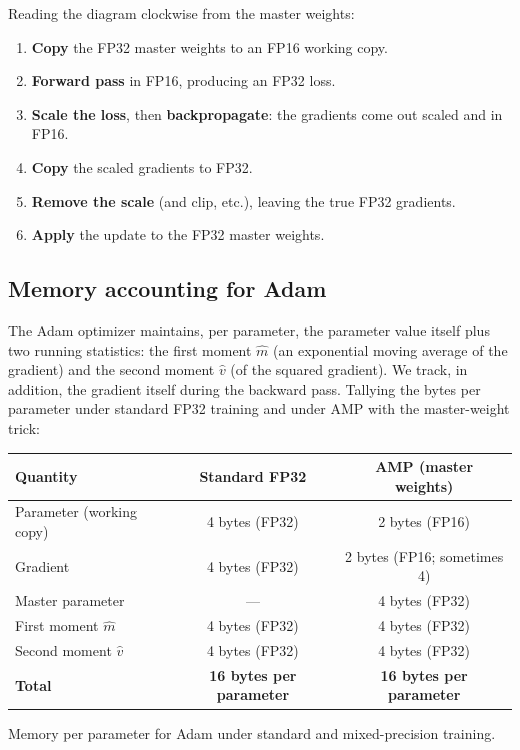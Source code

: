 \documentclass[11pt,a4paper]{article}
\theoremstyle{definition}
\theoremstyle{remark}
\theoremstyle{plain}
\begin{document}
Reading the diagram clockwise from the master weights:
\begin{enumerate}[leftmargin=1.8em, itemsep=2pt]
    \item \textbf{Copy} the FP32 master weights to an FP16 working copy.
    \item \textbf{Forward pass} in FP16, producing an FP32 loss.
    \item \textbf{Scale the loss}, then \textbf{backpropagate}: the
          gradients come out scaled and in FP16.
    \item \textbf{Copy} the scaled gradients to FP32.
    \item \textbf{Remove the scale} (and clip, etc.), leaving the true FP32
          gradients.
    \item \textbf{Apply} the update to the FP32 master weights.
\end{enumerate}

\subsection{Memory accounting for Adam}

The Adam optimizer maintains, per parameter, the parameter value itself
plus two running statistics: the first moment $\hat{m}$ (an exponential
moving average of the gradient) and the second moment $\hat{v}$ (of the
squared gradient). We track, in addition, the gradient itself during the
backward pass. Tallying the bytes per parameter under standard FP32
training and under AMP with the master-weight trick:

\begin{center}
\renewcommand{\arraystretch}{1.25}
\begin{tabular}{@{}lcc@{}}
\toprule
\textbf{Quantity} & \textbf{Standard FP32} & \textbf{AMP (master weights)} \\
\midrule
Parameter (working copy)  & 4 bytes (FP32) & 2 bytes (FP16) \\
Gradient                  & 4 bytes (FP32) & 2 bytes (FP16; sometimes 4) \\
Master parameter          & ---            & 4 bytes (FP32) \\
First moment $\hat{m}$    & 4 bytes (FP32) & 4 bytes (FP32) \\
Second moment $\hat{v}$   & 4 bytes (FP32) & 4 bytes (FP32) \\
\midrule
\textbf{Total}            & \textbf{16 bytes per parameter} &
                            \textbf{16 bytes per parameter} \\
\bottomrule
\end{tabular}
\par\smallskip
{\small Memory per parameter for Adam under standard and mixed-precision
training.}
\end{center}
\end{document}
